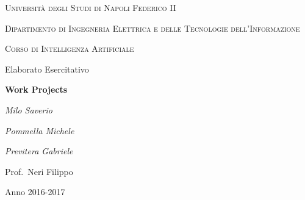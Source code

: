 \documentclass[a4paper,12pt]{report}
\begin{document}
        
	\begin{titlepage}
		\centering
		{\scshape\huge Università degli Studi di Napoli Federico II \par}
		\vspace{1cm}
		{\scshape\large Dipartimento di Ingegneria Elettrica e delle Tecnologie dell'Informazione\par}
		\vspace{0.5cm}
		{\scshape\large Corso di Intelligenza Artificiale\par}
		\vspace{1.5cm}
		{\ttfamily\Large Elaborato Esercitativo\par}
		\vspace{0.5cm}
		{\huge\bfseries Work Projects\par}
		\vspace{2cm}
		{\Large\itshape Milo Saverio\par}
		{\Large\itshape Pommella Michele\par}
		{\Large\itshape Previtera Gabriele\par}
		\vspace{1.5cm}
		{\large Prof.~Neri Filippo\par}
		
		\vfill
		
		{\large Anno 2016-2017\par}
		
		
		
		
	\end{titlepage}
\end{document}
